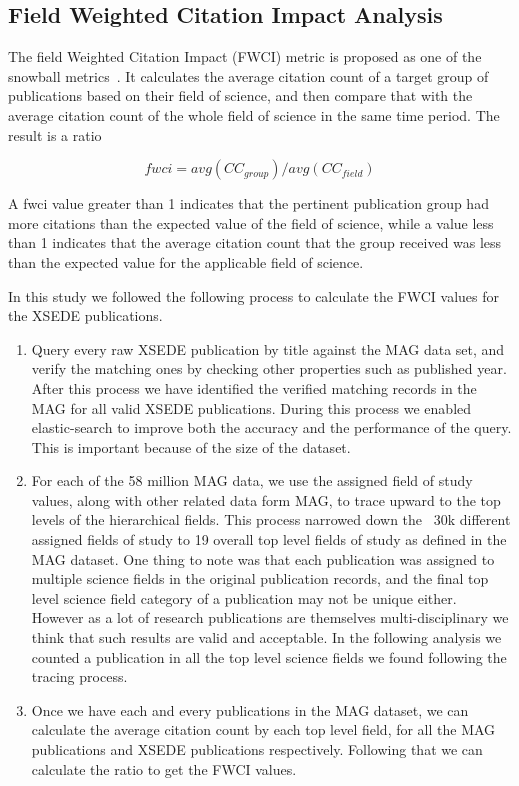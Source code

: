 \documentclass{sig-alternate}
\begin{document}
\subsection{Field Weighted Citation Impact Analysis}

The field Weighted Citation Impact (FWCI) metric is proposed as one of
the snowball metrics~\cite{colledge2014snowball}. It calculates the
average citation count of a target group of publications based on
their field of science, and then compare that with the average
citation count of the whole field of science in the same time
period. The result is a ratio

\[	fwci = avg(CC_{group})/avg(CC_{field}) \]

A fwci value greater than 1 indicates that the pertinent publication
group had more citations than the expected value of the field of
science, while a value less than 1 indicates that the average citation
count that the group received was less than the expected value for the
applicable field of science.

In this study we followed the following process to calculate the FWCI
values for the XSEDE publications.

\begin{enumerate}
\item Query every raw XSEDE publication by title against the MAG data
  set, and verify the matching ones by checking other properties such
  as published year. After this process we have identified the
  verified matching records in the MAG for all valid XSEDE
  publications.  During this process we enabled elastic-search to
  improve both the accuracy and the performance of the query.  This is
  important because of the size of the dataset.
\item For each of the 58 million MAG data, we use the assigned field
  of study values, along with other related data form MAG, to trace
  upward to the top levels of the hierarchical fields. This process
  narrowed down the ~30k different assigned fields of study to 19
  overall top level fields of study as defined in the MAG dataset.
  One thing to note was that each publication was assigned to multiple
  science fields in the original publication records, and the final
  top level science field category of a publication may not be unique
  either. However as a lot of research publications are themselves
  multi-disciplinary we think that such results are valid and
  acceptable. In the following analysis we counted a publication in
  all the top level science fields we found following the tracing
  process.
\item Once we have each and every publications in the MAG dataset, we
  can calculate the average citation count by each top level field,
  for all the MAG publications and XSEDE publications
  respectively. Following that we can calculate the ratio to get the
  FWCI values.
\end{enumerate}
\end{document}
